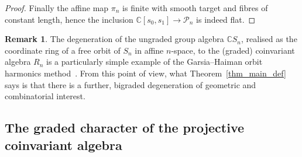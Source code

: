 \documentclass[a4paper,11pt]{amsart}
\theoremstyle{plain}
\theoremstyle{definition}
\newtheorem{remark}[theorem]{Remark}
\newcommand{\C}{\mathbb{C}}
\newcommand{\CP}{\mathscr{P}}
\begin{document}
\begin{proof}
Finally the affine map $\pi_n$ is finite with smooth target and fibres of constant length, hence the inclusion $\C[s_0, s_1]\rightarrow \CP_n$ is indeed flat. 
\end{proof}

\begin{remark} The degeneration of the ungraded group algebra $\C S_n$, realised as the coordinate ring of a free orbit of $S_n$ in affine $n$-space, to the (graded) coinvariant algebra $R_n$ is a particularly simple example of the Garsia--Haiman orbit harmonics method~\cite{GH}. 
From this point of view, what Theorem~\ref{thm_main_def} says is that there is a further, bigraded degeneration of geometric and combinatorial interest. 
\end{remark}


\subsection{The graded character of the projective coinvariant algebra}
\end{document}
